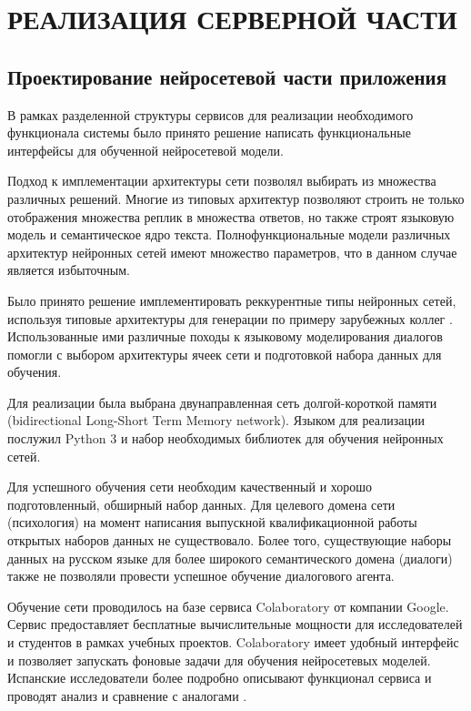 \chapter{РЕАЛИЗАЦИЯ СЕРВЕРНОЙ ЧАСТИ}
\section{Проектирование нейросетевой части приложения}
В рамках разделенной структуры сервисов для реализации необходимого функционала системы было принято решение написать функциональные интерфейсы для обученной нейросетевой модели. 

Подход к имплементации архитектуры сети позволял выбирать из множества различных решений. Многие из типовых архитектур позволяют строить не только отображения множества реплик в множества ответов, но также строят языковую модель и семантическое ядро текста. Полнофункциональные модели различных архитектур нейронных сетей имеют множество параметров, что в данном случае является избыточным. 

Было принято решение имплементировать реккурентные типы нейронных сетей, используя типовые архитектуры для генерации по примеру зарубежных коллег \cite{li2016deep, sharma2016natural,толкачев2019нейронное}. Использованные ими различные походы к языковому моделирования диалогов помогли с выбором архитектуры ячеек сети и подготовкой набора данных для обучения. 

Для реализации была выбрана двунаправленная сеть долгой-короткой памяти (bidirectional Long-Short Term Memory network). Языком для реализации послужил Python 3 и набор необходимых библиотек для обучения нейронных сетей.

Для успешного обучения сети необходим качественный и хорошо подготовленный, обширный набор данных. Для целевого домена сети (психология) на момент написания выпускной квалификационной работы открытых наборов данных не существовало. Более того, существующие наборы данных на русском языке для более широкого семантического домена (диалоги) также не позволяли провести успешное обучение диалогового агента. 

Обучение сети проводилось на базе сервиса Colaboratory от компании Google. Сервис предоставляет бесплатные вычислительные мощности для исследователей и студентов в рамках учебных проектов. Colaboratory имеет удобный интерфейс и позволяет запускать фоновые задачи для обучения нейросетевых моделей. Испанские исследователи более подробно описывают функционал сервиса и проводят анализ и сравнение с аналогами \cite{carneiro2018performance}.

